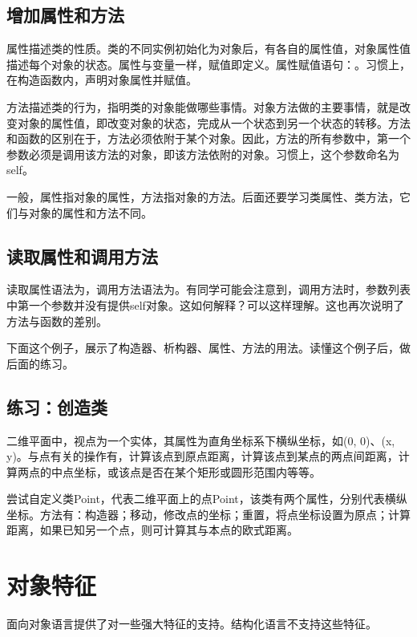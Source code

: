 \subsection{增加属性和方法}
属性描述类的性质。类的不同实例初始化为对象后，有各自的属性值，对象属性值描述每个对象的状态。属性与变量一样，赋值即定义。属性赋值语句：。习惯上，在构造函数内，声明对象属性并赋值。

方法描述类的行为，指明类的对象能做哪些事情。对象方法做的主要事情，就是改变对象的属性值，即改变对象的状态，完成从一个状态到另一个状态的转移。方法和函数的区别在于，方法必须依附于某个对象。因此，方法的所有参数中，第一个参数必须是调用该方法的对象，即该方法依附的对象。习惯上，这个参数命名为self。

一般，属性指对象的属性，方法指对象的方法。后面还要学习类属性、类方法，它们与对象的属性和方法不同。
\subsection{读取属性和调用方法}
读取属性语法为，调用方法语法为。有同学可能会注意到，调用方法时，参数列表中第一个参数并没有提供self对象。这如何解释？可以这样理解。这也再次说明了方法与函数的差别。

下面这个例子，展示了构造器、析构器、属性、方法的用法。读懂这个例子后，做后面的练习。
\subsection{练习：创造类}  
二维平面中，视点为一个实体，其属性为直角坐标系下横纵坐标，如(0, 0)、(x, y)。与点有关的操作有，计算该点到原点距离，计算该点到某点的两点间距离，计算两点的中点坐标，或该点是否在某个矩形或圆形范围内等等。

尝试自定义类Point，代表二维平面上的点Point，该类有两个属性，分别代表横纵坐标。方法有：构造器；移动，修改点的坐标；重置，将点坐标设置为原点；计算距离，如果已知另一个点，则可计算其与本点的欧式距离。

\section{对象特征}
面向对象语言提供了对一些强大特征的支持。结构化语言不支持这些特征。
